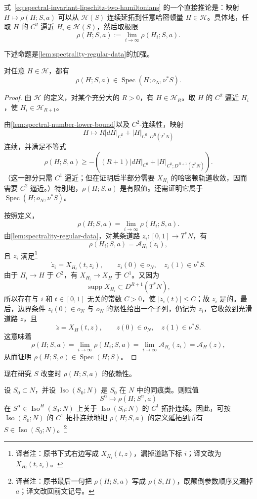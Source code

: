 式~\eqref{eq:spectral-invariant-lipschitz-two-hamiltonians} 的一个直接推论是：映射 $H\longmapsto\rho(H;S,a)$ 可以从 $\mathcal H(S)$ 连续延拓到任意哈密顿量 $H\in\mathcal H$。具体地，任取 $H$ 的 $C^2$ 逼近 $H_i\in\mathcal H(S)$，然后取极限
\[
  \rho(H;S,a):=\lim_{i\to\infty}\rho(H_i;S,a).
\]

下述命题是\cref{lem:spectrality-regular-data}的加强。

\begin{proposition}
\label{prop:spectrality-arbitrary-hamiltonian}
对任意 $H\in\mathcal H$，都有
\[
  \rho(H;S,a)\in\operatorname{Spec}(H;o_N,\nu^*S).
\]
\end{proposition}

\begin{proof}
由 $\mathcal H$ 的定义，对某个充分大的 $R>0$，有 $H\in\mathcal H_R$。取 $H$ 的 $C^2$ 逼近 $H_i$，使 $H_i\in\mathcal H_{R+1}$。

由\cref{lem:spectral-number-lower-bound}以及 $C^2$-连续性，映射
\[
  H\longmapsto
  R\lvert dH\rvert_{C^0}
  +\lvert H\rvert_{C^0;D^R(T^*N)}
\]
连续，并满足不等式
\[
  \rho(H;S,a)
  \ge-\left(
    (R+1)\lvert dH\rvert_{C^0}
    +\lvert H\rvert_{C^0;D^{R+1}(T^*N)}
  \right).
\]
（这一部分只需 $C^1$ 逼近；但在证明后半部分需要 $X_{H_i}$ 的哈密顿轨道收敛，因而需要 $C^2$ 逼近。）特别地，$\rho(H;S,a)$ 是有限值。还需证明它属于 $\operatorname{Spec}(H;o_N,\nu^*S)$。

按照定义，
\[
  \rho(H;S,a)=\lim_{i\to\infty}\rho(H_i;S,a).
\]
由\cref{lem:spectrality-regular-data}，对某条道路 $z_i:[0,1]\to T^*N$，有
\[
  \rho(H_i;S,a)=\mathcal A_{H_i}(z_i),
\]
且 $z_i$ 满足\footnote{译者注：原书下式右边写成 $X_{H_i}(t,z)$，漏掉道路下标 $i$；译文改为 $X_{H_i}(t,z_i)$。}
\[
  \dot z_i=X_{H_i}(t,z_i),
  \qquad z_i(0)\in o_N,
  \quad z_i(1)\in\nu^*S.
\]
由于 $H_i\to H$ 于 $C^2$，有 $X_{H_i}\to X_H$ 于 $C^1$。又因为
\[
  \operatorname{supp}X_{H_i}\subset D^{R+1}(T^*N),
\]
所以存在与 $i$ 和 $t\in[0,1]$ 无关的常数 $C>0$，使 $\lvert\dot z_i(t)\rvert\le C$；故 $z_i$ 是\termEquicontinuous{}的。最后，边界条件 $z_i(0)\in o_N$ 与 $o_N$ 的紧性给出一个子列，仍记为 $z_i$，它收敛到光滑道路 $z$，且
\[
  \dot z=X_H(t,z),
  \qquad z(0)\in o_N,
  \quad z(1)\in\nu^*S.
\]
这意味着
\[
  \rho(H;S,a)
  =\lim_{i\to\infty}\rho(H_i;S,a)
  =\lim_{i\to\infty}\mathcal A_{H_i}(z_i)
  =\mathcal A_H(z),
\]
从而证明 $\rho(H;S,a)\in\operatorname{Spec}(H;S)$。
\end{proof}

现在研究 $S$ 改变时 $\rho(H;S,a)$ 的依赖性。

\begin{proposition}
\label{prop:spectral-invariant-continuous-in-submanifold}
设 $S_0\subset N$，并设 $\operatorname{Iso}(S_0;N)$ 是 $S_0$ 在 $N$ 中的同痕类。则赋值
\[
  S^\alpha\longmapsto\rho(H;S^\alpha,a)
\]
在 $S^\alpha\in\operatorname{Iso}^{H}(S_0:N)$ 上关于 $\operatorname{Iso}(S_0:N)$ 的 $C^1$ 拓扑连续。因此，可按 $\operatorname{Iso}(S_0;N)$ 的 $C^1$ 拓扑连续地把 $\rho(H;S,a)$ 的定义延拓到所有 $S\in\operatorname{Iso}(S_0;N)$。\footnote{译者注：原书最后一句把 $\rho(H;S,a)$ 写成 $\rho(S,H)$，既颠倒参数顺序又漏掉 $a$；译文改回前文记号。}
\end{proposition}

